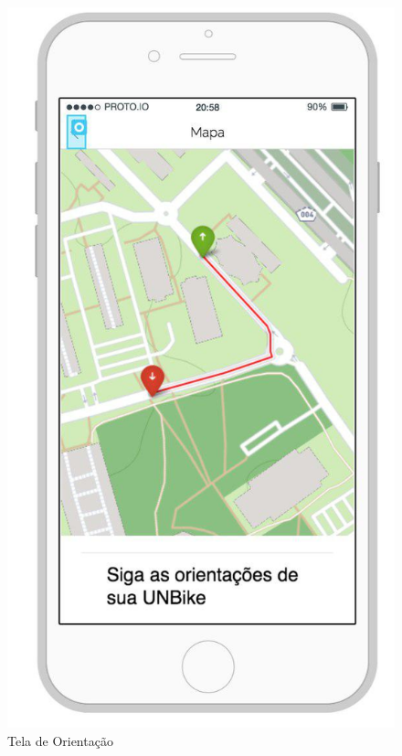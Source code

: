 \begin{figure}[!htb]
	\centering
	\includegraphics[scale=0.50]{tela_orientacao.jpg}
	\caption{Tela de Orientação}
	\label{img:telaorientacao}
\end{figure}

